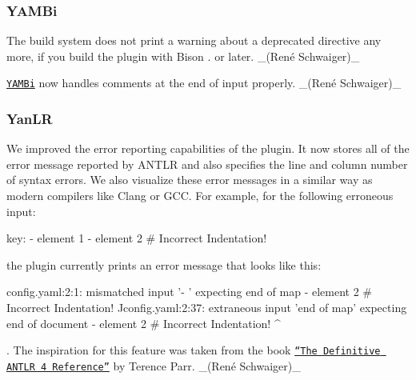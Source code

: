 \subsubsection*{Y\+A\+M\+Bi}


\begin{DoxyItemize}
\item The build system does not print a warning about a deprecated directive any more, if you build the plugin with Bison {.} or later. \+\_\+(René Schwaiger)\+\_\+
\item \href{https://www.libelektra.org/plugins/yambi}{\tt Y\+A\+M\+Bi} now handles comments at the end of input properly. \+\_\+(René Schwaiger)\+\_\+
\end{DoxyItemize}

\subsubsection*{Yan\+LR}


\begin{DoxyItemize}
\item We improved the error reporting capabilities of the plugin. It now stores all of the error message reported by A\+N\+T\+LR and also specifies the line and column number of syntax errors. We also visualize these error messages in a similar way as modern compilers like Clang or G\+CC. For example, for the following erroneous input\+:
\end{DoxyItemize}


\begin{DoxyCode}
key: - element 1
- element 2 # Incorrect Indentation!
\end{DoxyCode}


the plugin currently prints an error message that looks like this\+:


\begin{DoxyCode}
config.yaml:2:1: mismatched input '- ' expecting end of map
                 - element 2 # Incorrect Indentation!
                 ^^
config.yaml:2:37: extraneous input 'end of map' expecting end of document
                  - element 2 # Incorrect Indentation!
                                                      ^
\end{DoxyCode}


. The inspiration for this feature was taken from the book \href{https://pragprog.com/book/tpantlr2/the-definitive-antlr-4-reference}{\tt “\+The Definitive A\+N\+T\+LR 4 Reference”} by Terence Parr. \+\_\+(René Schwaiger)\+\_\+



